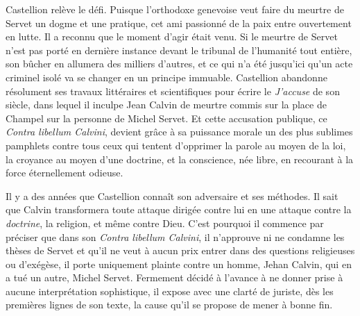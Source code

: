 \documentclass[french,twoside]{book} %
\newcommand{\astermono}{\medskip\centerline{\color{rubric}\large\selectfont{\syms ✻}}\medskip\par}%
\begin{document}
\noindent Castellion relève le défi. Puisque l’orthodoxe genevoise veut faire du meurtre de Servet un dogme et une pratique, cet ami passionné de la paix entre ouvertement en lutte. Il a reconnu que le moment d’agir était venu. Si le meurtre de Servet n’est pas porté en dernière instance devant le tribunal de l’humanité tout entière, son bûcher en allumera des milliers d’autres, et ce qui n’a été jusqu’ici qu’un acte criminel isolé va se changer en un principe immuable. Castellion abandonne résolument ses travaux littéraires et scientifiques pour écrire le \emph{J’accuse} de son siècle, dans lequel il inculpe Jean Calvin de meurtre commis sur la place de Champel sur la personne de Michel Servet. Et cette accusation publique, ce \emph{Contra libellum Calvini}, devient grâce à sa puissance morale un des plus sublimes pamphlets contre tous ceux qui tentent d’opprimer la parole au moyen de la loi, la croyance au moyen d’une doctrine, et la conscience, née libre, en recourant à la force éternellement odieuse.\par

\astermono

\noindent Il y a des années que Castellion connaît son adversaire et ses méthodes. Il sait que Calvin transformera toute attaque dirigée contre lui en une attaque contre la \emph{doctrine}, la religion, et même contre Dieu. C’est pourquoi il commence par préciser que dans son \emph{Contra libellum Calvini}, il n’approuve ni ne condamne les thèses de Servet et qu’il ne veut à aucun prix entrer dans des questions religieuses ou d’exégèse, il porte uniquement plainte contre un homme, Jehan Calvin, qui en a tué un autre, Michel Servet. Fermement décidé à l’avance à ne donner prise à aucune interprétation sophistique, il expose avec une clarté de juriste, dès les premières lignes de son texte, la cause qu’il se propose de mener à bonne fin.\par
\end{document}
